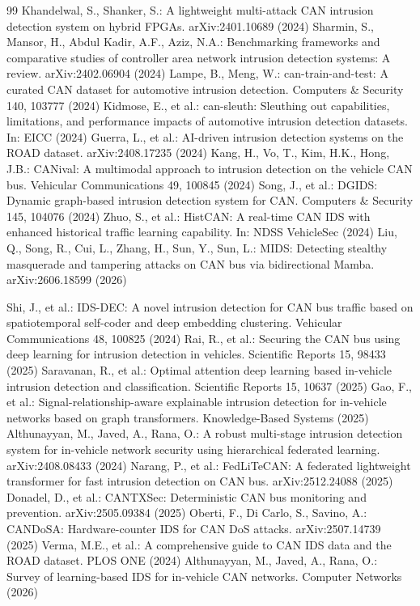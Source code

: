 \documentclass[runningheads]{llncs}
\begin{document}
\begin{thebibliography}{99}
 Khandelwal, S., Shanker, S.: A lightweight multi-attack CAN intrusion detection system on hybrid FPGAs. arXiv:2401.10689 (2024)
 Sharmin, S., Mansor, H., Abdul Kadir, A.F., Aziz, N.A.: Benchmarking frameworks and comparative studies of controller area network intrusion detection systems: A review. arXiv:2402.06904 (2024)
 Lampe, B., Meng, W.: can-train-and-test: A curated CAN dataset for automotive intrusion detection. Computers \& Security 140, 103777 (2024)
 Kidmose, E., et al.: can-sleuth: Sleuthing out capabilities, limitations, and performance impacts of automotive intrusion detection datasets. In: EICC (2024)
 Guerra, L., et al.: AI-driven intrusion detection systems on the ROAD dataset. arXiv:2408.17235 (2024)
 Kang, H., Vo, T., Kim, H.K., Hong, J.B.: CANival: A multimodal approach to intrusion detection on the vehicle CAN bus. Vehicular Communications 49, 100845 (2024)
 Song, J., et al.: DGIDS: Dynamic graph-based intrusion detection system for CAN. Computers \& Security 145, 104076 (2024)
 Zhuo, S., et al.: HistCAN: A real-time CAN IDS with enhanced historical traffic learning capability. In: NDSS VehicleSec (2024)
 Liu, Q., Song, R., Cui, L., Zhang, H., Sun, Y., Sun, L.: MIDS: Detecting stealthy masquerade and tampering attacks on CAN bus via bidirectional Mamba. arXiv:2606.18599 (2026)

 Shi, J., et al.: IDS-DEC: A novel intrusion detection for CAN bus traffic based on spatiotemporal self-coder and deep embedding clustering. Vehicular Communications 48, 100825 (2024)
 Rai, R., et al.: Securing the CAN bus using deep learning for intrusion detection in vehicles. Scientific Reports 15, 98433 (2025)
 Saravanan, R., et al.: Optimal attention deep learning based in-vehicle intrusion detection and classification. Scientific Reports 15, 10637 (2025)
 Gao, F., et al.: Signal-relationship-aware explainable intrusion detection for in-vehicle networks based on graph transformers. Knowledge-Based Systems (2025)
 Althunayyan, M., Javed, A., Rana, O.: A robust multi-stage intrusion detection system for in-vehicle network security using hierarchical federated learning. arXiv:2408.08433 (2024)
 Narang, P., et al.: FedLiTeCAN: A federated lightweight transformer for fast intrusion detection on CAN bus. arXiv:2512.24088 (2025)
 Donadel, D., et al.: CANTXSec: Deterministic CAN bus monitoring and prevention. arXiv:2505.09384 (2025)
 Oberti, F., Di Carlo, S., Savino, A.: CANDoSA: Hardware-counter IDS for CAN DoS attacks. arXiv:2507.14739 (2025)
 Verma, M.E., et al.: A comprehensive guide to CAN IDS data and the ROAD dataset. PLOS ONE (2024)
 Althunayyan, M., Javed, A., Rana, O.: Survey of learning-based IDS for in-vehicle CAN networks. Computer Networks (2026)


\end{thebibliography}
\end{document}
